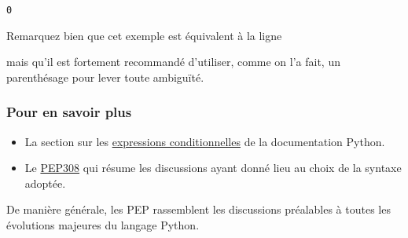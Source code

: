     \begin{Verbatim}[commandchars=\\\{\},frame=single,framerule=0.3mm,rulecolor=\color{cellframecolor}]
0
\end{Verbatim}

    Remarquez bien que cet exemple est équivalent à la ligne

\begin{Shaded}
\begin{Highlighting}[frame=lines,framerule=0.6mm,rulecolor=\color{asisframecolor}]
\OperatorTok{=}  \OperatorTok{<}    \OperatorTok{<=}   
\end{Highlighting}
\end{Shaded}

mais qu'il est fortement recommandé d'utiliser, comme on l'a fait, un
parenthésage pour lever toute ambiguïté.

    \hypertarget{pour-en-savoir-plus}{%
\subsubsection{Pour en savoir plus}\label{pour-en-savoir-plus}}

    \begin{itemize}
\tightlist
\item
  La section sur les
  \href{https://docs.python.org/3/reference/expressions.html\#conditional-expressions}{expressions
  conditionnelles} de la documentation Python.
\item
  Le \href{http://legacy.python.org/dev/peps/pep-0308/}{PEP308} qui
  résume les discussions ayant donné lieu au choix de la syntaxe
  adoptée.
\end{itemize}

De manière générale, les PEP rassemblent les discussions préalables à
toutes les évolutions majeures du langage Python.


    
    
    
